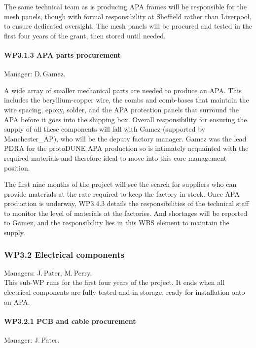 The same technical team as is producing APA frames will be responsible for the mesh panels, though with formal responsibility at Sheffield rather than Liverpool, to ensure dedicated oversight. The mesh panels will be procured and tested in the first four years of the grant, then stored until needed.

\paragraph{WP3.1.3 APA parts procurement} Manager: D.\,Gamez.

A wide array of smaller mechanical parts are needed to produce an APA. This includes the beryllium-copper wire, the combs and comb-bases that maintain the wire spacing, epoxy, solder, and the APA protection panels that surround the APA before it goes into the shipping box. Overall responsibility for ensuring the supply of all these components will fall with Gamez (supported by Manchester\_AP), who will be the deputy factory manager. Gamez was the lead PDRA for the protoDUNE APA production so is intimately acquainted with the required materials and therefore ideal to move into this core management position.

The first nine months of the project will see the search for suppliers who can provide materials at the rate required to keep the factory in stock. Once APA production is underway, WP3.4.3 details the responsibilities of the technical staff to monitor the level of materials at the factories. And shortages will be reported to Gamez, and the responsibility lies in this WBS element to maintain the supply.

\subsubsection{WP3.2 Electrical components}

Managers: J.\,Pater, M.\,Perry.\\
This sub-WP runs for the first four years of the project. It ends when all electrical components are fully tested and in storage, ready for installation onto an APA.

\paragraph{WP3.2.1 PCB and cable procurement}

Manager: J.\,Pater.

